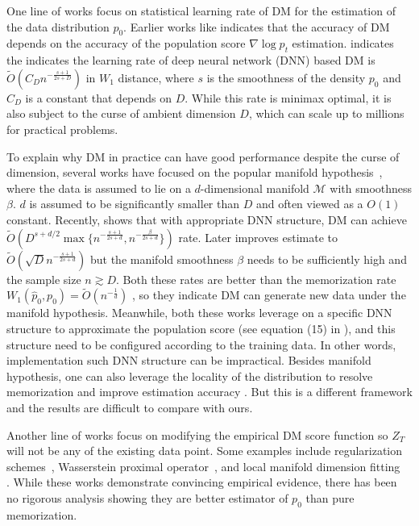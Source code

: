\documentclass{article}
\def\phat{\hat{p}}
\def\Otilde{\widetilde{O}}
\def\calM{\mathcal{M}}
\begin{document}
One line of works  focus on statistical learning rate of DM for the estimation of the data distribution $p_0$. Earlier works like \cite{chen2022sampling} indicates that the accuracy of DM depends on the accuracy of the population score $\nabla \log p_t$ estimation. \cite{oko2023diffusion} indicates the indicates the learning rate of deep neural network (DNN) based DM is  $\Otilde(C_D n^{-\frac{s+1}{2s+D}})$ in $W_1$ distance, where $s$ is the smoothness of the density $p_0$ and $C_D$ is a constant that depends on $D$. While this rate is minimax optimal, it is also subject to the curse of ambient dimension $D$, which can scale up to millions for practical problems. 

To explain why DM in practice can have good performance despite the curse of dimension, several works have focused on the popular manifold hypothesis~\cite{fefferman2016testing}, where the data is assumed to lie on a $d$-dimensional manifold  $\calM$ with smoothness $\beta$. $d$ is assumed to be significantly smaller than $D$ and often viewed as a $O(1)$ constant. Recently, 
\cite{tang2024adaptivity} shows that with appropriate DNN structure, DM can achieve $\Otilde(D^{s+d/2}\max\{n^{-\frac{s+1}{2s+d}},n^{-\frac{\beta}{2s+d}}\})$ rate. Later \cite{azangulov2024convergence} improves estimate to $\Otilde(\sqrt{D}n^{-\frac{s+1}{2s+d}})$ but the manifold smoothness $\beta$ needs to be sufficiently high and the sample size $n\gtrsim D$. Both these rates are better than the memorization rate $W_1(\phat_0, p_0)=\Otilde(n^{-\frac{1}{d}})$ \cite{fournier2015rate}, so they indicate DM can generate new data under the manifold hypothesis.
Meanwhile, 
both these works leverage on a specific DNN structure to approximate the population score (see equation (15) in \cite{azangulov2024convergence}), and this structure need to be configured according to the training data. In other words, implementation such DNN structure can be impractical. 
Besides manifold hypothesis, one can also leverage the locality of the distribution to resolve memorization and improve estimation accuracy \cite{kamb2024analytic,gottwald2025localized}. But this is a different framework and the results are difficult to compare with ours. 



Another line of works focus on modifying the empirical DM score function so $Z_T$ will not be any of the existing data point. Some examples include 
regularization schemes~\cite{baptista2025memorization}, Wasserstein proximal operator~\cite{zhang2024wasserstein}, and local manifold dimension fitting ~\cite{ross2024geometric}
. While these works demonstrate convincing empirical evidence, there has been no rigorous analysis showing they are better estimator of $p_0$ than pure memorization.
\end{document}
